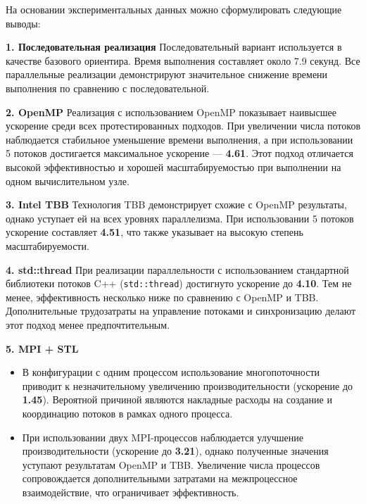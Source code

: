 \documentclass[a4paper,12pt]{article}
\begin{document}
На основании экспериментальных данных можно сформулировать следующие выводы:

\vspace{1em}
\textbf{1. Последовательная реализация}
Последовательный вариант используется в качестве базового ориентира. Время выполнения составляет около 7.9 секунд. Все параллельные реализации демонстрируют значительное снижение времени выполнения по сравнению с последовательной.

\vspace{1em}
\textbf{2. OpenMP}
Реализация с использованием OpenMP показывает наивысшее ускорение среди всех протестированных подходов. При увеличении числа потоков наблюдается стабильное уменьшение времени выполнения, а при использовании 5 потоков достигается максимальное ускорение — \textbf{4.61}. Этот подход отличается высокой эффективностью и хорошей масштабируемостью при выполнении на одном вычислительном узле.

\vspace{1em}
\textbf{3. Intel TBB}
Технология TBB демонстрирует схожие с OpenMP результаты, однако уступает ей на всех уровнях параллелизма. При использовании 5 потоков ускорение составляет \textbf{4.51}, что также указывает на высокую степень масштабируемости.

\vspace{1em}
\textbf{4. std::thread}
При реализации параллельности с использованием стандартной библиотеки потоков C++ (\texttt{std::thread}) достигнуто ускорение до \textbf{4.10}. Тем не менее, эффективность несколько ниже по сравнению с OpenMP и TBB. Дополнительные трудозатраты на управление потоками и синхронизацию делают этот подход менее предпочтительным.

\vspace{1em}
\textbf{5. MPI + STL}
\begin{itemize}
\item В конфигурации с одним процессом использование многопоточности приводит к незначительному увеличению производительности (ускорение до \textbf{1.45}). Вероятной причиной являются накладные расходы на создание и координацию потоков в рамках одного процесса.
\item При использовании двух MPI-процессов наблюдается улучшение производительности (ускорение до \textbf{3.21}), однако полученные значения уступают результатам OpenMP и TBB. Увеличение числа процессов сопровождается дополнительными затратами на межпроцессное взаимодействие, что ограничивает эффективность.
\end{itemize}
\end{document}
